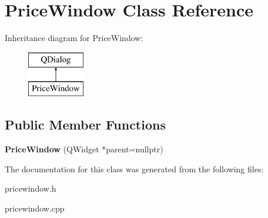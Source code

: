 \hypertarget{class_price_window}{\section{Price\-Window Class Reference}
\label{class_price_window}
}
Inheritance diagram for Price\-Window\-:\begin{figure}[H]
\begin{center}
\leavevmode
\includegraphics[height=2.000000cm]{class_price_window}
\end{center}
\end{figure}
\subsection*{Public Member Functions}
\begin{DoxyCompactItemize}
\item 
\hypertarget{class_price_window_aa94578d9d5be1c3d71a99aa7d5c98b9f}{{\bfseries Price\-Window} (Q\-Widget $\ast$parent=nullptr)}\label{class_price_window_aa94578d9d5be1c3d71a99aa7d5c98b9f}

\end{DoxyCompactItemize}


The documentation for this class was generated from the following files\-:\begin{DoxyCompactItemize}
\item 
pricewindow.\-h\item 
pricewindow.\-cpp\end{DoxyCompactItemize}
